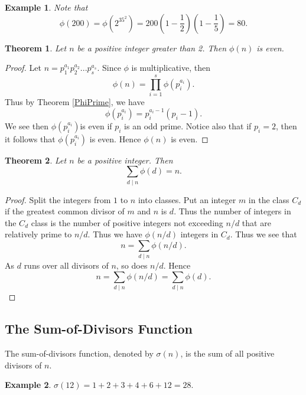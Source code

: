 \documentclass[12pt,letterpaper]{book}
\newtheorem{theorem}{Theorem}
\newtheorem{example}{Example}
\begin{document}
\begin{example}
Note that
\begin{equation*}
\phi(200)=\phi(2^35^2)=200\left(1-\frac{1}{2}\right)\left(1-\frac{1}{5}\right)=80.
\end{equation*}
\end{example}

\begin{theorem}
Let $n$ be a positive integer greater than 2.  Then $\phi(n)$ is
even.
\end{theorem}

\begin{proof}
Let $n=p_1^{a_1}p_2^{a_2}...p_s^{a_s}$.  Since $\phi$ is
multiplicative, then
\begin{equation*}
\phi(n)=\prod_{i=1}^s\phi(p_i^{a_i}).
\end{equation*}
Thus by Theorem \ref{PhiPrime}, we have
\begin{equation*}
\phi(p_i^{a_i})=p_i^{a_i-1}(p_i-1).
\end{equation*}
We see then $\phi(p_i^{a_i})$is even if $p_i$ is an odd prime.
Notice also that if $p_i=2$, then it follows that $\phi(p_i^{a_i})$
is even.  Hence $\phi(n)$ is even.
\end{proof}

\begin{theorem}\label{PhiSum}
Let $n$ be a positive integer.  Then
\begin{equation*}
\sum_{d\mid n}\phi(d)=n.
\end{equation*}
\end{theorem}

\begin{proof}
Split the integers from $1$ to $n$ into classes.  Put an integer $m$
in the class $C_d$ if the greatest common divisor of $m$ and $n$
is $d$.  Thus the number of integers in the $C_d$ class is the
number of positive integers not exceeding $n/d$ that are relatively
prime to $n/d$.  Thus we have $\phi(n/d)$ integers in $C_d$.  Thus we
see that
\begin{equation*}
n=\sum_{d\mid n}\phi(n/d).
\end{equation*}
As $d$ runs over all divisors of $n$, so does $n/d$.  Hence
\begin{equation*}
n=\sum_{d\mid n}\phi(n/d)=\sum_{d\mid n}\phi(d).
\end{equation*}
\end{proof}

\subsection{\textbf{The Sum-of-Divisors Function}}
The sum-of-divisors function, denoted by $\sigma(n)$, is the sum of
all positive divisors of $n$. 
\begin{example}
$\sigma(12)=1+2+3+4+6+12=28.$
\end{example}
\end{document}
